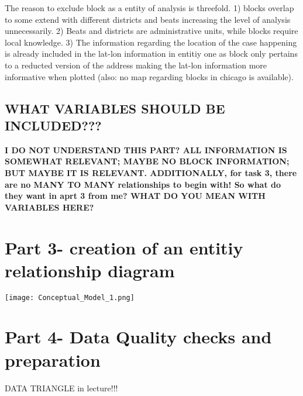 \documentclass[a4paper]{article}
\begin{document}
The reason to exclude block as a entity of analysis is threefold. 1) blocks overlap to some extend with different districts and beats increasing the level of analysis unnecessarily. 2) Beats and districts are administrative units, while blocks require local knowledge. 3) The information regarding the location of the case happening is already included in the lat-lon information in entitiy one as block only pertains to a reducted version of the address making the lat-lon information more informative when plotted (also: no map regarding blocks in chicago is available). 


\subsection{WHAT VARIABLES SHOULD BE INCLUDED???}
\textbf{I DO NOT UNDERSTAND THIS PART? ALL INFORMATION IS SOMEWHAT RELEVANT; MAYBE NO BLOCK INFORMATION; BUT MAYBE IT IS RELEVANT. ADDITIONALLY, for task 3, there are no MANY TO MANY relationships to begin with! So what do they want in aprt 3 from me? WHAT DO YOU MEAN WITH VARIABLES HERE?}


\section{Part 3- creation of an entitiy relationship diagram}


\texttt{[image: Conceptual\_Model\_1.png]}


\section{Part 4- Data Quality checks and preparation}
DATA TRIANGLE in lecture!!!
\end{document}
